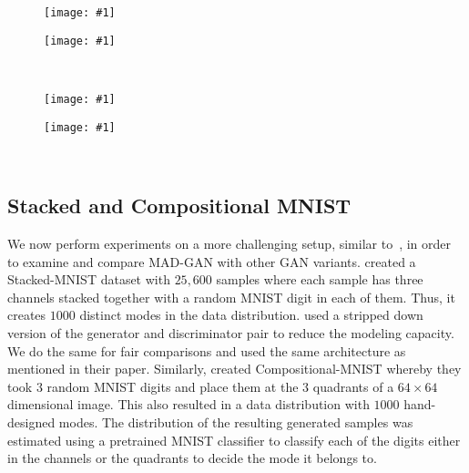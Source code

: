 \newcommand{\addSubFigHalf}[2]{\begin{subfigure}{.48\linewidth}
		\centering
		\texttt{[image: \#1]}
		\label{#2}\end{subfigure}
}

\begin{figure*}
	\centering
	\addSubFigHalf{pix2pix_bags1}{fig:bags1} 
	\addSubFigHalf{pix2pix_bags2}{fig:bags2} \\
	\label{fig:pix2pixBag}
	\vspace{-2mm}
\end{figure*}

\begin{figure*}
	\centering
	\addSubFigHalf{InfoGAN_bags1}{fig:infobags1} 
	\addSubFigHalf{InfoGAN_bags2}{fig:infobags2} \\
	\label{fig:pix2pixBag_infoGAN}
	\vspace{-3mm}
\end{figure*}

\subsection{Stacked and Compositional MNIST}
We now perform experiments on a more challenging setup, similar to~\cite{che2016mode,metz2017unrolledGAN}, in order to examine and compare MAD-GAN with other GAN variants. \cite{metz2017unrolledGAN} created a Stacked-MNIST dataset with $25,600$ samples where each sample has three channels stacked together with a random MNIST digit in each of them. Thus, it creates $1000$ distinct modes in the data distribution. \cite{metz2017unrolledGAN} used a stripped down version of the generator and discriminator pair to reduce the modeling capacity. We do the same for fair comparisons and used the same architecture as mentioned in their paper. Similarly, \cite{che2016mode} created Compositional-MNIST whereby they took $3$ random MNIST digits and place them at the $3$ quadrants of a $64 \times 64$ dimensional image. This also resulted in a data distribution with $1000$ hand-designed modes. The distribution of the resulting generated samples was estimated using a pretrained MNIST classifier to classify each of the digits either in the channels or the quadrants to decide the mode it belongs to. 

